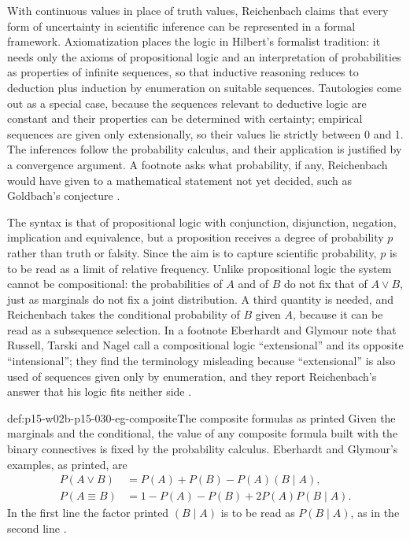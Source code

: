 With continuous values in place of truth values, Reichenbach claims that
every form of uncertainty in scientific inference can be represented in
a formal framework. Axiomatization places the logic in Hilbert's
formalist tradition: it needs only the axioms of propositional logic and
an interpretation of probabilities as properties of infinite sequences,
so that inductive reasoning reduces to deduction plus induction by
enumeration on suitable sequences. Tautologies come out as a special
case, because the sequences relevant to deductive logic are constant and
their properties can be determined with certainty; empirical sequences
are given only extensionally, so their values lie strictly between 0
and 1. The inferences follow the probability calculus, and their
application is justified by a convergence argument. A footnote asks what
probability, if any, Reichenbach would have given to a mathematical
statement not yet decided, such as Goldbach's conjecture
\cite[p.~369 and n.~6]{EberhardtGlymour2011ReichenbachReading}.

The syntax is that of propositional logic with conjunction,
disjunction, negation, implication and equivalence, but a proposition
receives a degree of probability \(p\) rather than truth or falsity.
Since the aim is to capture scientific probability, \(p\) is to be read
as a limit of relative frequency. Unlike propositional logic the system
cannot be compositional: the probabilities of \(A\) and of \(B\) do not
fix that of \(A\lor B\), just as marginals do not fix a joint
distribution. A third quantity is needed, and Reichenbach takes the
conditional probability of \(B\) given \(A\), because it can be read as
a subsequence selection. In a footnote Eberhardt and Glymour note that Russell,
Tarski and Nagel call a compositional logic ``extensional'' and its
opposite ``intensional''; they find the terminology misleading because
``extensional'' is also used of sequences given only by enumeration, and
they report Reichenbach's answer that his logic fits neither side
\cite[p.~370 and n.~7]{EberhardtGlymour2011ReichenbachReading}.

\begin{hbdefinition}{def:p15-w02b-p15-030-eg-composite}{The composite formulas as printed}
Given the marginals and the conditional, the value of any composite
formula built with the binary connectives is fixed by the probability
calculus. Eberhardt and Glymour's examples, as printed, are
\[
\begin{aligned}
 P(A\lor B)&=P(A)+P(B)-P(A)(B\mid A),\\
 P(A\equiv B)&=1-P(A)-P(B)+2P(A)P(B\mid A).
\end{aligned}
\]
In the first line the factor printed \((B\mid A)\) is to be read as
\(P(B\mid A)\), as in the second line
\cite[p.~370]{EberhardtGlymour2011ReichenbachReading}.
\end{hbdefinition}

